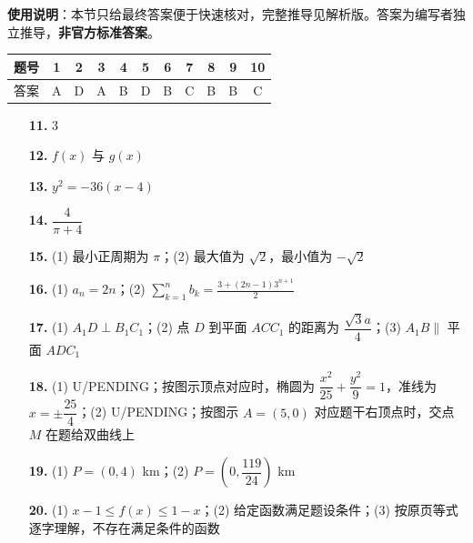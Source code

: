 
\begin{gknotice}
\textbf{使用说明}：本节只给最终答案便于快速核对，完整推导见解析版。答案为编写者独立推导，\textbf{非官方标准答案}。
\end{gknotice}

\begin{center}\begin{tabular}{ccccccccccc}
\toprule
题号 & 1 & 2 & 3 & 4 & 5 & 6 & 7 & 8 & 9 & 10 \\
\midrule
答案 & A & D & A & B & D & B & C & B & B & C \\
\bottomrule
\end{tabular}\end{center}

\begin{itemize}[leftmargin=2.6em]
  \item[\textbf{11.}] 3
  \item[\textbf{12.}] \(f(x)\) 与 \(g(x)\)
  \item[\textbf{13.}] \(y^2=-36(x-4)\)
  \item[\textbf{14.}] \(\dfrac4{\pi+4}\)
\end{itemize}

\begin{itemize}[leftmargin=2.6em]
  \item[\textbf{15.}] (1) 最小正周期为 \(\pi\)；(2) 最大值为 \(\sqrt2\)，最小值为 \(-\sqrt2\)
  \item[\textbf{16.}] (1) \(a_n=2n\)；(2) \(\displaystyle\sum_{k=1}^{n}b_k=\frac{3+(2n-1)3^{n+1}}2\)
  \item[\textbf{17.}] (1) \(A_1D\perp B_1C_1\)；(2) 点 \(D\) 到平面 \(ACC_1\) 的距离为 \(\dfrac{\sqrt3a}{4}\)；(3) \(A_1B\parallel\) 平面 \(ADC_1\)
  \item[\textbf{18.}] (1) U/PENDING；按图示顶点对应时，椭圆为 \(\dfrac{x^2}{25}+\dfrac{y^2}{9}=1\)，准线为 \(x=\pm\dfrac{25}{4}\)；(2) U/PENDING；按图示 \(A=(5,0)\) 对应题干右顶点时，交点 \(M\) 在题给双曲线上
  \item[\textbf{19.}] (1) \(P=(0,4)\) km；(2) \(P=(0,\dfrac{119}{24})\) km
  \item[\textbf{20.}] (1) \(x-1\le f(x)\le1-x\)；(2) 给定函数满足题设条件；(3) 按原页等式逐字理解，不存在满足条件的函数
\end{itemize}
